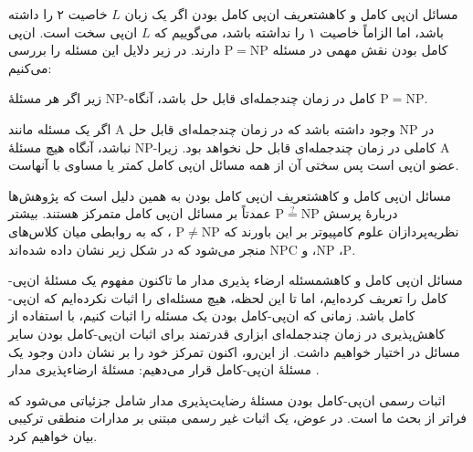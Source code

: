\begin{itemframe-s}{مسائل ان‌پی کامل و کاهش}{تعریف ان‌پی کامل بودن}
\itm
اگر یک زبان $L$ خاصیت ۲ را داشته باشد، اما الزاماً خاصیت ۱ را نداشته باشد، می‌گوییم که
 $L$
ان‌پی سخت
 است.
\itm
ان‌پی کامل بودن نقش مهمی در مسئله $\mathrm{P} = \mathrm{NP}$ دارند. در زیر دلایل این مسئله را بررسی می‌کنیم:
\item[1]
زیر اگر هر مسئلهٔ NP-کامل در زمان چندجمله‌ای قابل حل باشد، آنگاه $\mathrm{P} = \mathrm{NP}$.
\item[2]
 اگر یک مسئله مانند A در $\mathrm{NP}$ وجود داشته باشد که در زمان چندجمله‌ای قابل حل نباشد، آنگاه هیچ مسئلهٔ NP-کاملی در زمان چندجمله‌ای قابل حل نخواهد بود. زیرا A عضو ان‌پی است پس سختی آن از همه مسائل ان‌پی کامل کمتر یا مساوی با آنهاست.
\end{itemframe-s}

\begin{itemframe-s}{مسائل ان‌پی کامل و کاهش}{تعریف ان‌پی کامل بودن}
\itm
به همین دلیل است که پژوهش‌ها دربارهٔ پرسش
$\mathrm{P} \stackrel{?}{=} \mathrm{NP}$
عمدتاً بر مسائل ان‌پی کامل متمرکز هستند. بیشتر نظریه‌پردازان علوم کامپیوتر بر این باورند که
$\mathrm{P} \ne \mathrm{NP}$
، که به روابطی میان کلاس‌های
 $\mathrm{P}$، $\mathrm{NP}$، و $\mathrm{NPC}$
 منجر می‌شود که در شکل زیر نشان داده شده‌اند.
\itm
{}
\end{itemframe-s}

\begin{itemframe-s}{مسائل ان‌پی کامل و کاهش}{مسئله ارضاء پذیری مدار}
\itm
ما تاکنون مفهوم یک مسئلهٔ ان‌پی‌-کامل را تعریف کرده‌ایم، اما تا این لحظه، هیچ مسئله‌ای را اثبات نکرده‌ایم که ان‌پی‌-کامل باشد.
\itm
زمانی که ان‌پی‌-کامل بودن یک مسئله را اثبات کنیم، با استفاده از کاهش‌پذیری در زمان چندجمله‌ای ابزاری قدرتمند برای اثبات ان‌پی‌-کامل بودن سایر مسائل در اختیار خواهیم داشت.
\itm
از این‌رو، اکنون تمرکز خود را بر نشان دادن وجود یک مسئلهٔ ان‌پی‌-کامل قرار می‌دهیم: مسئلهٔ ارضاء‌پذیری مدار
 .

\itm
اثبات رسمی ان‌پی‌-کامل بودن مسئلهٔ رضایت‌پذیری مدار شامل جزئیاتی می‌شود که فراتر از بحث ما است. در عوض، یک اثبات غیر رسمی مبتنی بر مدارات منطقی ترکیبی بیان خواهیم کرد.
\end{itemframe-s}


